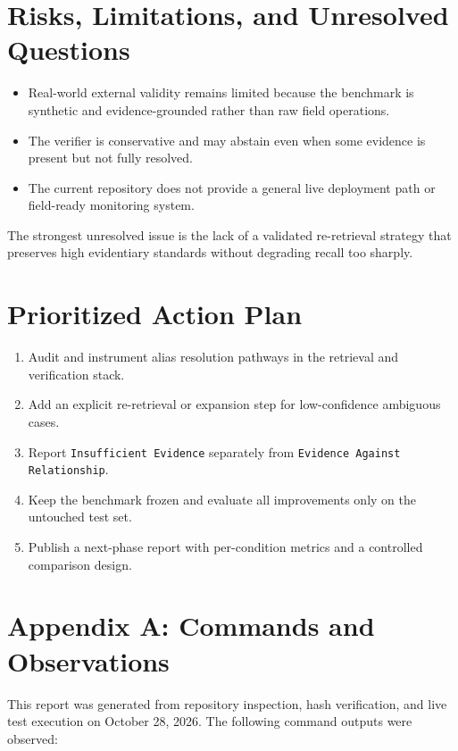 \documentclass[11pt,a4paper]{article}
\begin{document}
\section{Risks, Limitations, and Unresolved Questions}

\begin{itemize}[leftmargin=1.5em]
  \item Real-world external validity remains limited because the benchmark is synthetic and evidence-grounded rather than raw field operations.
  \item The verifier is conservative and may abstain even when some evidence is present but not fully resolved.
  \item The current repository does not provide a general live deployment path or field-ready monitoring system.
\end{itemize}

The strongest unresolved issue is the lack of a validated re-retrieval strategy that preserves high evidentiary standards without degrading recall too sharply.

\section{Prioritized Action Plan}

\begin{enumerate}[leftmargin=1.5em]
  \item Audit and instrument alias resolution pathways in the retrieval and verification stack.
  \item Add an explicit re-retrieval or expansion step for low-confidence ambiguous cases.
  \item Report \texttt{Insufficient Evidence} separately from \texttt{Evidence Against Relationship}.
  \item Keep the benchmark frozen and evaluate all improvements only on the untouched test set.
  \item Publish a next-phase report with per-condition metrics and a controlled comparison design.
\end{enumerate}

\appendix

\section{Appendix A: Commands and Observations}

This report was generated from repository inspection, hash verification, and live test execution on October 28, 2026. The following command outputs were observed:
\end{document}
